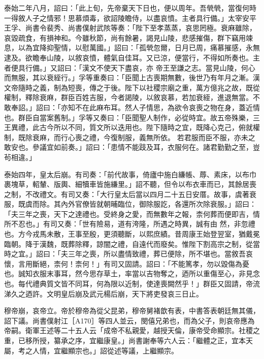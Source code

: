 \begin{pinyinscope}
 泰始二年八月，詔曰：「此上旬，先帝棄天下日也，便以周年。吾煢煢，當復何時一得敘人子之情邪！思慕煩毒，欲詔陵瞻侍，以盡哀憤。主者具行備。」太宰安平王孚、尚書令裴秀、尚書僕射武陔等奏：「陛下至孝蒸蒸，哀思罔極。衰麻雖除，哀毀疏食，有損神和。今雖秋節，尚有餘暑，謁見山陵，悲感摧傷，群下竊用竦息，以為宜降抑聖情，以慰萬國。」詔曰：「孤煢忽爾，日月已周，痛慕摧感，永無逮及。欲瞻奉山陵，以敘哀憤，體氣自佳耳。又已涼，便當行，不得如所奏也。主者便具行備。」又詔曰：「漢文不使天下盡哀，亦
 帝王至謙之志。當見山陵，何心而無服，其以衰絰行。」孚等重奏曰：「臣聞上古喪期無數，後世乃有年月之漸。漢文帝隨時之義，制為短喪，傳之于後。陛下以社稷宗廟之重，萬方億兆之故，既從權制，釋除衰麻，群臣百姓吉服，今者謁陵，以敘哀慕，若加衰絰，進退無當。不敢奉詔。」詔曰：「亦知不在此麻布耳。然人子情思，為欲令哀喪之物在身，蓋近情也。群臣自當案舊制。」孚等又奏曰：「臣聞聖人制作，必從時宜。故五帝殊樂，三王異禮，此古今所以不同，質文所以迭用也。陛下隨時之宜，既降心克己，俯就權制，既除衰麻，而行心喪之禮，今復制服，義無所依。
 若君服而臣不服，亦未之敢安也。參議宜如前奏。」詔曰：「患情不能跂及耳，衣服何在。諸君勤勤之至，豈茍相違。」



 泰始四年，皇太后崩。有司奏：「前代故事，倚廬中施白縑帳、蓐、素床，以布巾裹塊草，軺輦、版輿、細犢車皆施縑里。」詔不聽，但令以布衣車而已，其餘居喪之制，不改禮文。有司又奏：「大行皇太后當以四月二十五日安厝。故事，虞著衰服，既虞而除。其內外官僚皆就朝晡臨位，御除服訖，各還所次除衰服。」詔曰：「夫三年之喪，天下之達禮也。受終身之愛，而無數年之報，柰何葬而便即吉，情所不忍也。」有司又奏：「世有險易，道有洿隆，所遇之時異，誠有由
 然，非忽禮也。方今戎馬未散，王事至殷，更須聽斷，以熙庶績。昔周康王始登翌室，猶戴冕臨朝。降于漢魏，既葬除釋，諒闇之禮，自遠代而廢矣。惟陛下割高宗之制，從當時之宜。」詔曰：「夫三年之喪，所以盡情致禮，葬已便除，所不堪也。當敘吾哀懷，言用斷絕，柰何！柰何！」有司又固請。詔曰：「不能篤孝，勿以毀傷為憂也。誠知衣服末事耳，然今思存草土，率當以吉物奪之，迺所以重傷至心，非見念也。每代禮典質文皆不同耳，何為限以近制，使達喪闕然乎！」群臣又固請，帝流涕久之迺許。文明皇后崩及武元楊后崩，天下將吏發哀三日止。



 穆帝崩，哀帝立。帝於穆帝為從父昆弟，穆帝舅褚歆有表，中書答表朝廷無其儀，詔下議。尚書僕射江［A170］等四人並云，閔僖兄弟也，而為父子，則哀帝應為帝嗣。衛軍王述等二十五人云「成帝不私親愛，越授天倫，康帝受命顯宗。社稷之重，已移所授，纂承之序，宜繼康皇。」尚書謝奉等六人云：「繼體之正，宜本天屬，考之人情，宜繼顯宗也。」詔從述等議，上繼顯宗。




\end{pinyinscope}
